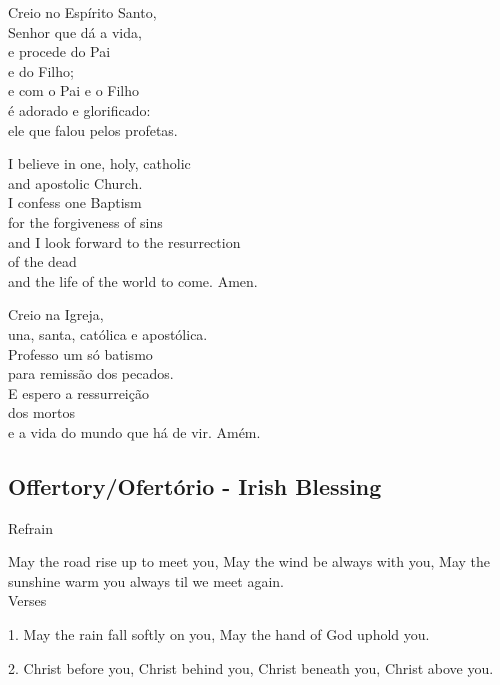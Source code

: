 \documentclass[10pt,a4]{article}
\begin{document}
\begin{paracol}{2}
\switchcolumn

Creio no Espírito Santo,  \\
Senhor que dá a vida,  \\
e procede do Pai \\
e do Filho;  \\
e com o Pai e o Filho \\
é adorado e glorificado:  \\
ele que falou pelos profetas.  \\

\switchcolumn*

I believe in one, holy, catholic\\
and apostolic Church.\\
I confess one Baptism\\
for the forgiveness of sins\\
and I look forward to the resurrection\\
of the dead\\
and the life of the world to come. Amen.\\

\switchcolumn

Creio na Igreja, \\
una, santa, católica e apostólica.  \\
Professo um só batismo \\
para remissão dos pecados.  \\
E espero a ressurreição \\
dos mortos  \\
e a vida do mundo que há de vir. Amém.

\switchcolumn*

\end{paracol}

\begin{center}
\subsection*{Offertory/Ofert\'orio - Irish Blessing}
\end{center}

Refrain

May the road rise up to meet you,
May the wind be always with you,
May the sunshine warm you always
til we meet again.\\

Verses

1. May the rain fall softly on you,
May the hand of God uphold you.

2. Christ before you, Christ behind you,
Christ beneath you, Christ above you.
\end{document}
